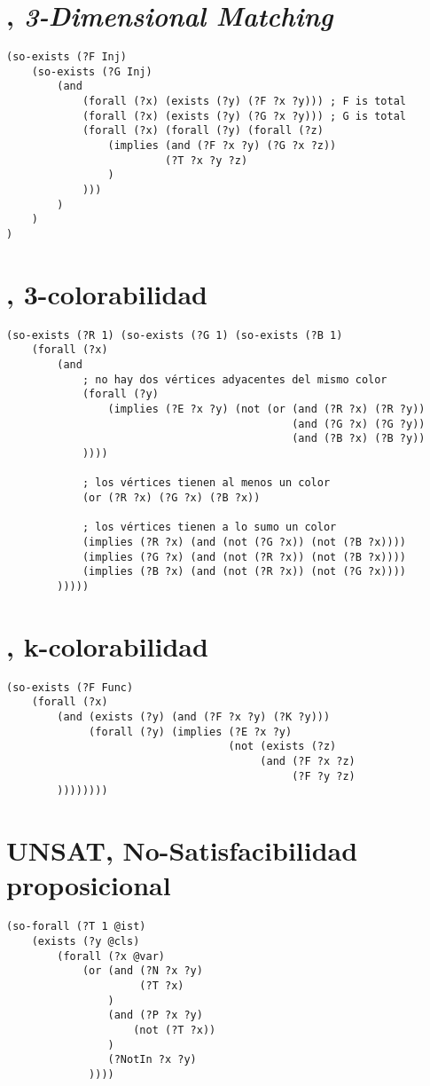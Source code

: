 \section{\TDM, \textit{3-Dimensional Matching}}
\begin{verbatim}
(so-exists (?F Inj)
    (so-exists (?G Inj)
        (and
            (forall (?x) (exists (?y) (?F ?x ?y))) ; F is total
            (forall (?x) (exists (?y) (?G ?x ?y))) ; G is total
            (forall (?x) (forall (?y) (forall (?z)
                (implies (and (?F ?x ?y) (?G ?x ?z))
                         (?T ?x ?y ?z)
                )
            )))
        )
    )
)
\end{verbatim}

\section{\TCOL, 3-colorabilidad}
\begin{verbatim}
(so-exists (?R 1) (so-exists (?G 1) (so-exists (?B 1)
    (forall (?x) 
        (and
            ; no hay dos vértices adyacentes del mismo color
            (forall (?y)
                (implies (?E ?x ?y) (not (or (and (?R ?x) (?R ?y))
                                             (and (?G ?x) (?G ?y))
                                             (and (?B ?x) (?B ?y))
            ))))

            ; los vértices tienen al menos un color
            (or (?R ?x) (?G ?x) (?B ?x))

            ; los vértices tienen a lo sumo un color
            (implies (?R ?x) (and (not (?G ?x)) (not (?B ?x))))
            (implies (?G ?x) (and (not (?R ?x)) (not (?B ?x))))
            (implies (?B ?x) (and (not (?R ?x)) (not (?G ?x))))
        )))))
\end{verbatim}

\section{\KCOL, k-colorabilidad}
\begin{verbatim}
(so-exists (?F Func)
    (forall (?x) 
        (and (exists (?y) (and (?F ?x ?y) (?K ?y)))
             (forall (?y) (implies (?E ?x ?y)
                                   (not (exists (?z)
                                        (and (?F ?x ?z)
                                             (?F ?y ?z)
        ))))))))
\end{verbatim}

\section{UNSAT, No-Satisfacibilidad proposicional}
\begin{verbatim}
(so-forall (?T 1 @ist)
    (exists (?y @cls)
        (forall (?x @var)
            (or (and (?N ?x ?y)
                     (?T ?x)
                )
                (and (?P ?x ?y)
                    (not (?T ?x))
                )
                (?NotIn ?x ?y)
             ))))
\end{verbatim}

